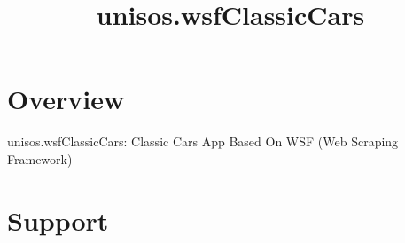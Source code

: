 \documentclass{article}
\begin{document}

\begin{comment}
*  [[elisp:(org-cycle)][| ]]  *DBLK: front-begin*                                       :: [[elisp:(beginning-of-buffer)][Top]] [[elisp:(delete-other-windows)][(1)]]  [[elisp:(org-cycle)][| ]]
\end{comment}


\begin{comment}
*  [[elisp:(org-cycle)][| ]]  *DBLK: copyright*                                       :: [[elisp:(beginning-of-buffer)][Top]] [[elisp:(delete-other-windows)][(1)]]  [[elisp:(org-cycle)][| ]]
\end{comment}


\begin{comment}
*  [[elisp:(org-cycle)][| ]]  *DBLK: front-end*                                       :: [[elisp:(beginning-of-buffer)][Top]] [[elisp:(delete-other-windows)][(1)]]  [[elisp:(org-cycle)][| ]]
\end{comment}


\begin{comment}
*  [[elisp:(org-cycle)][| ]]  *DBLK: main-begin*                                       :: [[elisp:(beginning-of-buffer)][Top]] [[elisp:(delete-other-windows)][(1)]]  [[elisp:(org-cycle)][| ]]
\end{comment}

\title{unisos.wsfClassicCars}


\thispagestyle{empty}


\bigskip

\section{Overview}

unisos.wsfClassicCars: Classic Cars App Based On WSF (Web Scraping Framework)

\section{Support}
\end{document}
